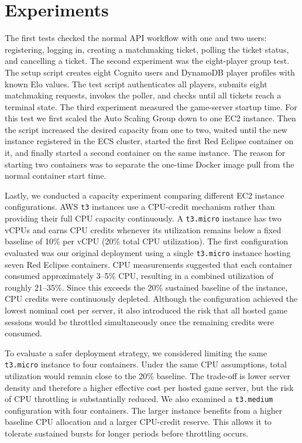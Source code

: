 \documentclass[9pt,a4paper,twocolumn,twoside]{tau-class/tau}
\begin{document}
\section{Experiments}

    The first tests checked the normal API workflow with one and two users: registering, logging in, creating a matchmaking ticket, polling the ticket status, and cancelling a ticket. 
    The second experiment was the eight-player group test. The setup script creates eight Cognito users and DynamoDB player profiles with known Elo values. The test script authenticates all players, submits eight matchmaking requests, invokes the poller, and checks until all tickets reach a terminal state. 
    The third experiment measured the game-server startup time. For this test we first scaled the Auto Scaling Group down to one EC2 instance. Then the script increased the desired capacity from one to two, waited until the new instance registered in the ECS cluster, started the first Red Eclipse container on it, and finally started a second container on the same instance. The reason for starting two containers was to separate the one-time Docker image pull from the normal container start time.

   Lastly, we conducted a capacity experiment comparing different EC2 instance configurations. 
   AWS \texttt{t3} instances use a CPU-credit mechanism rather than providing their full CPU capacity continuously. 
   A \texttt{t3.micro} instance has two vCPUs and earns CPU credits whenever its utilization remains below a fixed baseline of 10\% per vCPU (20\% total CPU utilization). 
   The first configuration evaluated was our original deployment using a single \texttt{t3.micro} instance hosting seven Red Eclipse containers. 
   CPU measurements suggested that each container consumed approximately 3--5\% CPU, resulting in a combined utilization of roughly 21--35\%. Since this exceeds the 20\% sustained baseline of the instance, CPU credits were continuously depleted. 
   Although the configuration achieved the lowest nominal cost per server, it also introduced the risk that all hosted game sessions would be throttled simultaneously once the remaining credits were consumed.
   
   To evaluate a safer deployment strategy, we considered limiting the same \texttt{t3.micro} instance to four containers. Under the same CPU assumptions, total utilization would remain close to the 20\% baseline.
   The trade-off is lower server density and therefore a higher effective cost per hosted game server, but the risk of CPU throttling is substantially reduced.
   We also examined a \texttt{t3.medium} configuration with four containers. The larger instance benefits from a higher baseline CPU allocation and a larger CPU-credit reserve. This allows it to tolerate sustained bursts for longer periods before throttling occurs. 
   
\end{document}
